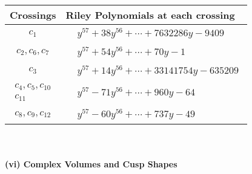 \documentclass[1p]{elsarticle_modified}
\theoremstyle{definition}
\begin{document}
\begin{tabular}{m{50pt}|m{274pt}}
Crossings & \hspace{64pt}Riley Polynomials at each crossing \\
\hline $$\begin{aligned}c_{1}\end{aligned}$$&$\begin{aligned}
&y^{57}+38 y^{56}+\cdots+7632286 y-9409
\end{aligned}$\\
\hline $$\begin{aligned}c_{2},c_{6},c_{7}\end{aligned}$$&$\begin{aligned}
&y^{57}+54 y^{56}+\cdots+70 y-1
\end{aligned}$\\
\hline $$\begin{aligned}c_{3}\end{aligned}$$&$\begin{aligned}
&y^{57}+14 y^{56}+\cdots+33141754 y-635209
\end{aligned}$\\
\hline $$\begin{aligned}c_{4},c_{5},c_{10}\\c_{11}\end{aligned}$$&$\begin{aligned}
&y^{57}-71 y^{56}+\cdots+960 y-64
\end{aligned}$\\
\hline $$\begin{aligned}c_{8},c_{9},c_{12}\end{aligned}$$&$\begin{aligned}
&y^{57}-60 y^{56}+\cdots+737 y-49
\end{aligned}$\\
\hline
\end{tabular}\\~\\
\newpage\flushleft \textbf{(vi) Complex Volumes and Cusp Shapes}
\end{document}
